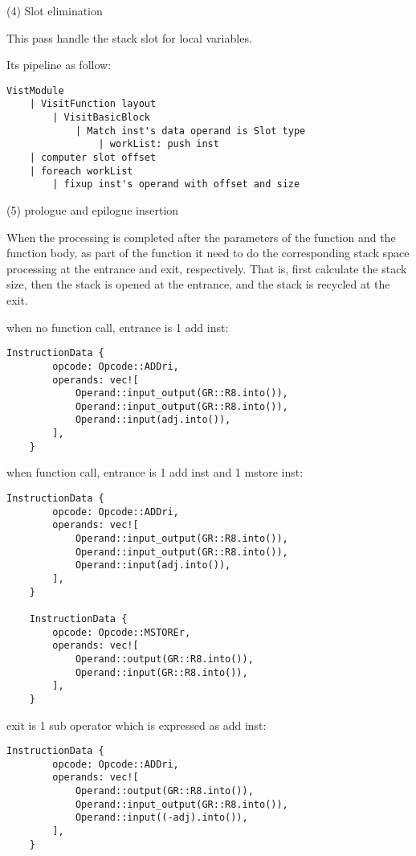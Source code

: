 \begin{itemize}
(4) Slot elimination

This pass handle the stack slot for local variables.

Its pipeline as follow:
\begin{lstlisting}[language={}]
VistModule
    | VisitFunction layout
        | VisitBasicBlock
            | Match inst's data operand is Slot type
                | workList: push inst 
    | computer slot offset
    | foreach workList
        | fixup inst's operand with offset and size
\end{lstlisting}

(5) prologue and epilogue insertion

When the processing is completed after the parameters of the function and the function body, 
as part of the function it need to do the corresponding stack space processing at the entrance and exit, respectively. 
That is, first calculate the stack size, then the stack is opened at the entrance, and the stack is recycled at the exit.

when no function call, entrance is 1 add inst:
\begin{lstlisting}[language={}]
    InstructionData {
        opcode: Opcode::ADDri,
        operands: vec![
            Operand::input_output(GR::R8.into()),
            Operand::input_output(GR::R8.into()),
            Operand::input(adj.into()),
        ],
    }
\end{lstlisting}

when function call, entrance is  1 add inst and 1 mstore inst:
\begin{lstlisting}[language={}]
    InstructionData {
        opcode: Opcode::ADDri,
        operands: vec![
            Operand::input_output(GR::R8.into()),
            Operand::input_output(GR::R8.into()),
            Operand::input(adj.into()),
        ],
    }

    InstructionData {
        opcode: Opcode::MSTOREr,
        operands: vec![
            Operand::output(GR::R8.into()),
            Operand::input(GR::R8.into()),
        ],
    }
\end{lstlisting}

exit is 1 sub operator which is expressed as add inst:
\begin{lstlisting}[language={}]
    InstructionData {
        opcode: Opcode::ADDri,
        operands: vec![
            Operand::output(GR::R8.into()),
            Operand::input_output(GR::R8.into()),
            Operand::input((-adj).into()),
        ],
    }
\end{lstlisting}



\end{itemize}
